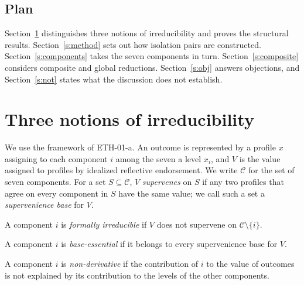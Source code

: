 \documentclass{situationist-preprint}
\begin{document}
\subsection{Plan}

Section~\ref{s:notions} distinguishes three notions of irreducibility and proves the structural results. Section~\ref{s:method} sets out how isolation pairs are constructed. Section~\ref{s:components} takes the seven components in turn. Section~\ref{s:composite} considers composite and global reductions. Section~\ref{s:obj} answers objections, and Section~\ref{s:not} states what the discussion does not establish.

\section{Three notions of irreducibility}\label{s:notions}

We use the framework of ETH-01-a. An outcome is represented by a profile $x$ assigning to each component $i$ among the seven a level $x_i$, and $V$ is the value assigned to profiles by idealized reflective endorsement. We write $\mathcal{C}$ for the set of seven components. For a set $S \subseteq \mathcal{C}$, $V$ \emph{supervenes} on $S$ if any two profiles that agree on every component in $S$ have the same value; we call such a set a \emph{supervenience base} for $V$.

\begin{definition}\label{d:formal}
A component $i$ is \emph{formally irreducible} if $V$ does not supervene on $\mathcal{C}\setminus\{i\}$.
\end{definition}

\begin{definition}\label{d:essential}
A component $i$ is \emph{base-essential} if it belongs to every supervenience base for $V$.
\end{definition}

\begin{definition}\label{d:nonderiv}
A component $i$ is \emph{non-derivative} if the contribution of $i$ to the value of outcomes is not explained by its contribution to the levels of the other components.
\end{definition}
\end{document}
